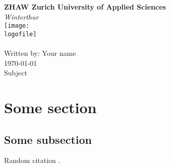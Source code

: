 \documentclass{article}
\newcommand{\orgname}{ZHAW Zurich University of Applied Sciences}
\newcommand{\orglocation}{Winterthur}
\newcommand{\yourname}{Your name}
\newcommand{\subject}{Subject}
\newcommand{\logofile}{img/logo.png}
\begin{document}
\begin{titlepage}
    \centering
    \LARGE\textbf{\orgname} \\
    \large\textit{\orglocation} \\
    \texttt{[image: \\logofile]} \\
    \Huge\textbf{} \\
    \normalsize
    Written by: \yourname \\
    \today \\
    \subject
\end{titlepage}

\newpage

\thispagestyle{fancy}

\tableofcontents

\newpage

\section{Some section}

\subsection{Some subsection}

Random citation \cite{author_title_year}.

\newpage

\end{document}
